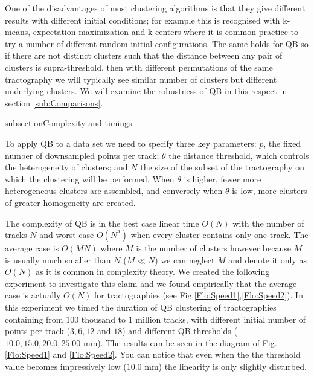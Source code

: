 \documentclass[preprint,authoryear,a4paper,10pt,onecolumn]{elsarticle}
\begin{document}
One of the disadvantages of most clustering algorithms is that they
give different results with different initial conditions; for example
this is recognised with k-means, expectation-maximization\cite{dempster1977maximum}
and k-centers\cite{gonzalez1985clustering} where it is common practice
to try a number of different random initial configurations. The same
holds for QB so if there are not distinct clusters such that the distance
between any pair of clusters is supra-threshold, then with different
permutations of the same tractography we will typically see similar
number of clusters but different underlying clusters. We will examine
the robustness of QB in this respect in section \ref{sub:Comparisons}.

subsection{Complexity and timings\label{sub:Complexity}}

To apply QB to a data set we need to specify three key parameters:
$p$, the fixed number of downsampled points per track; $\theta$
the distance threshold, which controls the heterogeneity of clusters;
and $N$ the size of the subset of the tractography on which the clustering
will be performed. When $\theta$ is higher, fewer more heterogeneous
clusters are assembled, and conversely when $\theta$ is low, more
clusters of greater homogeneity are created.

The complexity of QB is in the best case linear time $O(N)$ with
the number of tracks $N$ and worst case $O(N^{2})$ when every cluster
contains only one track. The average case is $O(MN)$ where $M$ is
the number of clusters however because $M$ is usually much smaller
than $N$ ($M\ll N$) we can neglect $M$ and denote it only as $O(N)$
as it is common in complexity theory. We created the following experiment
to investigate this claim and we found empirically that the average
case is actually $O(N)$ for tractographies (see Fig.\ref{Flo:Speed1},\ref{Flo:Speed2}).
In this experiment we timed the duration of QB clustering of tractographies
containing from $100$ thousand to $1$ million tracks, with different
initial number of points per track ($3,6,12$ and $18$) and different
QB thresholds ($10.0,15.0,20.0,25.00$ mm). The results can be seen
in the diagram of Fig.\ref{Flo:Speed1} and \ref{Flo:Speed2}. You
can notice that even when the the threshold value becomes impressively
low ($10.0$ mm) the linearity is only slightly disturbed.
\end{document}
